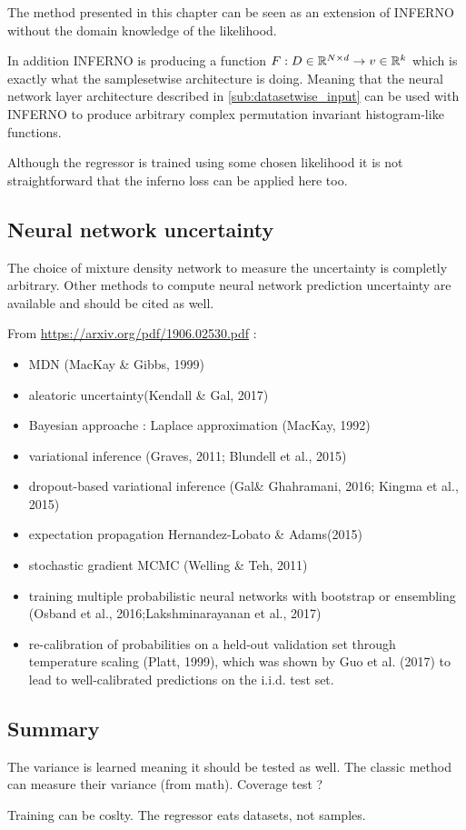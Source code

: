 The method presented in this chapter can be seen as an extension of INFERNO without the domain knowledge of the likelihood.

In addition INFERNO is producing a function $ F : D \in \mathbb{R}^{N\times d} \to v \in \mathbb{R}^k $ which is exactly what the samplesetwise architecture is doing.
Meaning that the neural network layer architecture described in \autoref{sub:datasetwise_input} can be used with INFERNO to produce arbitrary complex permutation invariant histogram-like functions.

Although the regressor is trained using some chosen likelihood it is not straightforward that the inferno loss can be applied here too.


\subsection{Neural network uncertainty} %
\label{sub:neural_network_uncertainty}

The choice of mixture density network to measure the uncertainty is completly arbitrary.
Other methods to compute neural network prediction uncertainty are available and should be cited as well.


From \url{https://arxiv.org/pdf/1906.02530.pdf} :
\begin{itemize}
	\item MDN (MacKay \& Gibbs, 1999)
	\item aleatoric uncertainty(Kendall \& Gal, 2017)
	\item Bayesian approache : Laplace approximation (MacKay, 1992)
	\item variational inference (Graves, 2011; Blundell et al., 2015)
	\item dropout-based variational inference (Gal\& Ghahramani, 2016; Kingma et al., 2015)
	\item expectation propagation Hernandez-Lobato \& Adams(2015)
	\item stochastic gradient MCMC (Welling \& Teh, 2011)
	\item  training multiple probabilistic neural networks with bootstrap or ensembling (Osband et al., 2016;Lakshminarayanan et al., 2017)
	\item re-calibration of probabilities on a held-out validation set through temperature scaling (Platt, 1999), which was shown by Guo et al. (2017) to lead to well-calibrated predictions on the i.i.d. test set.
\end{itemize}



\subsection*{Summary} %
\label{sub:summary}


The variance is learned meaning it should be tested as well.
The classic method can measure their variance (from math).
Coverage test ?

Training can be coslty.
The regressor eats datasets, not samples.

